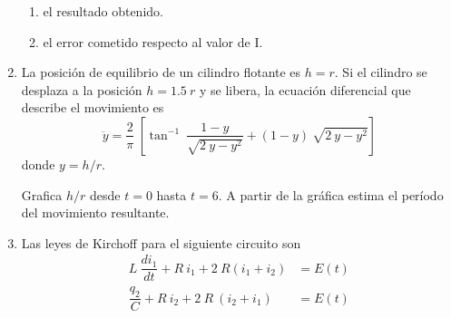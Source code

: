 \documentclass[11pt]{article}
\begin{document}
\begin{enumerate}
\begin{enumerate}
\item el resultado obtenido.
\item el error cometido respecto al valor de I.
\end{enumerate}
\item La posición de equilibrio de un cilindro flotante es $h = r$. Si el cilindro se desplaza a la posición $h = 1.5 \: r$ y se libera, la ecuación diferencial que describe el movimiento es
\[ \ddot{y} = \dfrac{2}{\pi} \: \left[ \tan^{-1} \: \dfrac{1 - y}{\sqrt{2 \: y - y^{2}}} + (1 - y) \: \sqrt{2 \: y - y^{2}} \right] \]
donde $y = h / r$.
\begin{figure}[H]
\centering
{}
\end{figure}
Grafica $h/r$ desde $t = 0$ hasta $t = 6$. A partir de la gráfica estima el período del movimiento resultante.
\item Las leyes de Kirchoff para el siguiente circuito son
\begin{align}
L \: \dfrac{d i_{1}}{dt} +  R \: i_{1} + 2 \: R (i_{1} + i_{2}) &=  E(t) \label{eq:ecuacion_a} \\
\dfrac{q_{2}}{C} + R \: i_{2} + 2 \: R \: (i_{2} + i_{1}) &= E(t) \label{eq:ecuacion_b}
\end{align}
\par
\begin{figure}[!h]
	\centering
	
	
\end{figure}
\end{enumerate}
\end{document}
